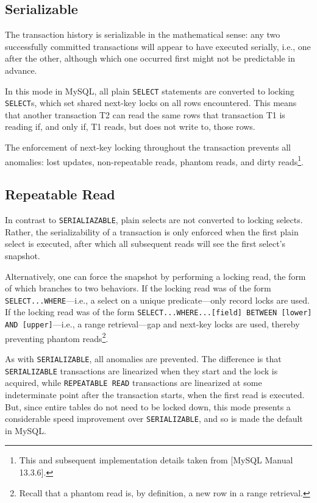 \documentclass[12pt]{article} %
\begin{document}
\subsection{Serializable}
The transaction history is serializable in the mathematical sense: any two successfully committed transactions will appear to have executed serially, i.e., one after the other, although which one occurred first might not be predictable in advance. 

In this mode in MySQL, all plain \texttt{SELECT} statements are converted to locking \texttt{SELECT}s, which set shared next-key locks on all rows encountered. This means that another transaction T2 can read the same rows that transaction T1 is reading if, and only if, T1 reads, but does not write to, those rows. 

The enforcement of next-key locking throughout the transaction prevents all anomalies: lost updates, non-repeatable reads, phantom reads, and dirty reads\footnote{This and subsequent implementation details taken from [MySQL Manual 13.3.6].}.

\subsection{Repeatable Read}
In contrast to \texttt{SERIALIAZABLE}, plain selects are not converted to locking selects. Rather, the serializability of a transaction is only enforced when the first plain select is executed, after which all subsequent reads will see the first select's snapshot. 

Alternatively, one can force the snapshot by performing a locking read, the form of which branches to two behaviors. If the locking read was of the form \texttt{SELECT...WHERE}---i.e., a select on a unique predicate---only record locks are used. If the locking read was of the form \texttt{SELECT...WHERE...[field] BETWEEN [lower] AND [upper]}---i.e., a range retrieval---gap and next-key locks are used, thereby preventing phantom reads\footnote{Recall that a phantom read is, by definition, a new row in a range retrieval.}.

As with \texttt{SERIALIZABLE}, all anomalies are prevented. The difference is that \texttt{SERIALIZABLE} transactions are linearized when they start and the lock is acquired, while \texttt{REPEATABLE READ} transactions are linearized at some indeterminate point after the transaction starts, when the first read is executed. But, since entire tables do not need to be locked down, this mode presents a considerable speed improvement over \texttt{SERIALIZABLE}, and so is made the default in MySQL.
\end{document}
